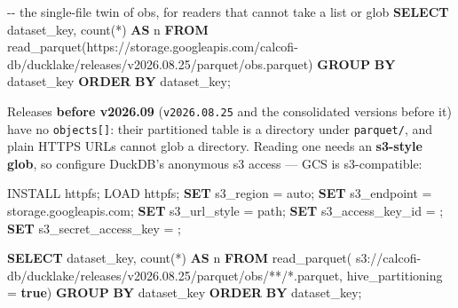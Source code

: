 \documentclass[
  letterpaper,
  DIV=11,
  numbers=noendperiod]{scrreprt}
\newenvironment{Shaded}{\begin{snugshade}}{\end{snugshade}}
\newcommand{\CommentTok}[1]{\textcolor[rgb]{0.37,0.37,0.37}{#1}}
\newcommand{\FunctionTok}[1]{\textcolor[rgb]{0.28,0.35,0.67}{#1}}
\newcommand{\KeywordTok}[1]{\textcolor[rgb]{0.00,0.23,0.31}{\textbf{#1}}}
\newcommand{\NormalTok}[1]{\textcolor[rgb]{0.00,0.23,0.31}{#1}}
\newcommand{\OperatorTok}[1]{\textcolor[rgb]{0.37,0.37,0.37}{#1}}
\newcommand{\StringTok}[1]{\textcolor[rgb]{0.13,0.47,0.30}{#1}}
\begin{document}
\begin{Shaded}
\begin{Highlighting}[]
\CommentTok{{-}{-} the single{-}file twin of obs, for readers that cannot take a list or glob}
\KeywordTok{SELECT}\NormalTok{ dataset\_key, }\FunctionTok{count}\NormalTok{(}\OperatorTok{*}\NormalTok{) }\KeywordTok{AS}\NormalTok{ n}
\KeywordTok{FROM}\NormalTok{ read\_parquet(}\StringTok{\textquotesingle{}https://storage.googleapis.com/calcofi{-}db/ducklake/releases/v2026.08.25/parquet/obs.parquet\textquotesingle{}}\NormalTok{)}
\KeywordTok{GROUP} \KeywordTok{BY}\NormalTok{ dataset\_key}
\KeywordTok{ORDER} \KeywordTok{BY}\NormalTok{ dataset\_key;}
\end{Highlighting}
\end{Shaded}

Releases \textbf{before v2026.09} (\texttt{v2026.08.25} and the
consolidated versions before it) have no \texttt{objects{[}{]}}: their
partitioned table is a directory under \texttt{parquet/}, and plain
HTTPS URLs cannot glob a directory. Reading one needs an
\textbf{s3-style glob}, so configure DuckDB's anonymous s3 access ---
GCS is s3-compatible:

\begin{Shaded}
\begin{Highlighting}[]
\NormalTok{INSTALL httpfs; LOAD httpfs;}
\KeywordTok{SET}\NormalTok{ s3\_region            }\OperatorTok{=} \StringTok{\textquotesingle{}auto\textquotesingle{}}\NormalTok{;}
\KeywordTok{SET}\NormalTok{ s3\_endpoint          }\OperatorTok{=} \StringTok{\textquotesingle{}storage.googleapis.com\textquotesingle{}}\NormalTok{;}
\KeywordTok{SET}\NormalTok{ s3\_url\_style         }\OperatorTok{=} \StringTok{\textquotesingle{}path\textquotesingle{}}\NormalTok{;}
\KeywordTok{SET}\NormalTok{ s3\_access\_key\_id     }\OperatorTok{=} \StringTok{\textquotesingle{}\textquotesingle{}}\NormalTok{;}
\KeywordTok{SET}\NormalTok{ s3\_secret\_access\_key }\OperatorTok{=} \StringTok{\textquotesingle{}\textquotesingle{}}\NormalTok{;}

\KeywordTok{SELECT}\NormalTok{ dataset\_key, }\FunctionTok{count}\NormalTok{(}\OperatorTok{*}\NormalTok{) }\KeywordTok{AS}\NormalTok{ n}
\KeywordTok{FROM}\NormalTok{ read\_parquet(}
  \StringTok{\textquotesingle{}s3://calcofi{-}db/ducklake/releases/v2026.08.25/parquet/obs/**/*.parquet\textquotesingle{}}\NormalTok{,}
\NormalTok{  hive\_partitioning }\OperatorTok{=} \KeywordTok{true}\NormalTok{)}
\KeywordTok{GROUP} \KeywordTok{BY}\NormalTok{ dataset\_key}
\KeywordTok{ORDER} \KeywordTok{BY}\NormalTok{ dataset\_key;}
\end{Highlighting}
\end{Shaded}
\end{document}

